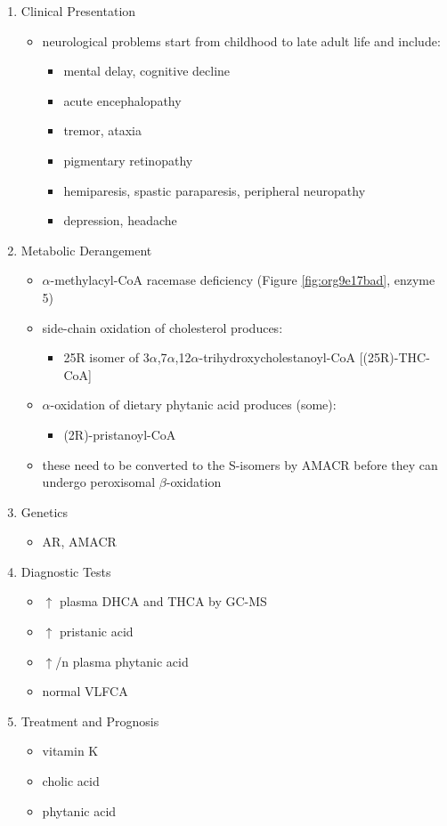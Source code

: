 \documentclass{scrartcl}
\begin{document}
\begin{enumerate}
\item Clinical Presentation
\label{sec:orgaa68b23}
\begin{itemize}
\item neurological problems start from childhood to late adult life and
include:
\begin{itemize}
\item mental delay, cognitive decline
\item acute encephalopathy
\item tremor, ataxia
\item pigmentary retinopathy
\item hemiparesis, spastic paraparesis, peripheral neuropathy
\item depression, headache
\end{itemize}
\end{itemize}

\item Metabolic Derangement
\label{sec:org32e127d}
\begin{itemize}
\item \(\alpha\)-methylacyl-CoA racemase deficiency (Figure \ref{fig:org9e17bad}, enzyme 5)
\item side-chain oxidation of cholesterol produces:
\begin{itemize}
\item 25R isomer of 3\(\alpha\),7\(\alpha\),12\(\alpha\)-trihydroxycholestanoyl-CoA [(25R)-THC-CoA]
\end{itemize}
\item \(\alpha\)-oxidation of dietary phytanic acid produces (some):
\begin{itemize}
\item (2R)-pristanoyl-CoA
\end{itemize}
\item these need to be converted to the S-isomers by AMACR before they can
undergo peroxisomal \(\beta\)-oxidation
\end{itemize}

\item Genetics
\label{sec:orgbb45af3}
\begin{itemize}
\item AR, AMACR
\end{itemize}

\item Diagnostic Tests
\label{sec:org4a81d15}
\begin{itemize}
\item \(\uparrow\) plasma DHCA and THCA by GC-MS
\item \(\uparrow\) pristanic acid
\item \(\uparrow\)/n plasma phytanic acid
\item normal VLFCA
\end{itemize}

\item Treatment and Prognosis
\label{sec:org88d86ba}
\begin{itemize}
\item vitamin K
\item cholic acid
\item phytanic acid
\end{itemize}
\end{enumerate}
\end{document}
